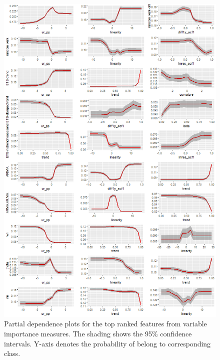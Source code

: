 \documentclass[11pt,a4paper,]{article}
\theoremstyle{definition}
\theoremstyle{definition}
\theoremstyle{definition}
\theoremstyle{remark}
\begin{document}
\begin{figure}
\centering
\includegraphics{figures/pdpyearly-1.png}
\caption{\label{fig:pdpyearly}Partial dependence plots for the top ranked
features from variable importance measures. The shading shows the 95\%
confidence intervals. Y-axis denotes the probability of belong to
corresponding class.}
\end{figure}

\newpage
\end{document}
